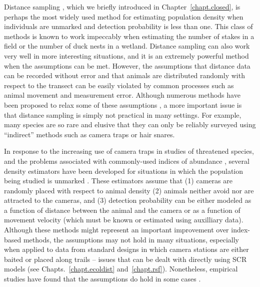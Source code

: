 Distance sampling \citep{buckland_etal:2001,buckland_etal:2004book}, which we briefly
introduced in Chapter~\ref{chapt.closed},
is perhaps the most widely used method for
estimating population density when individuals are unmarked and
detection probability is less than one. This class of methods is known
to work impeccably when estimating the number of stakes in a field or
the number of duck nests in a wetland. Distance sampling can also work very well in
more interesting situations, and it is an extremely powerful method when
the assumptions can be met. However, the assumptions that distance
data can be recorded without error and that animals are distributed
randomly with respect to the transect can be easily violated by
common processes such as animal movement and measurement
error. Although numerous methods have been proposed to
relax some of these assumptions
\citep{royle_etal:2004, borchers_etal:1998, johnson_etal:2010,
  marques_etal:2010, chandler_etal:2011},
a more important issue is that distance
sampling is simply not practical in many settings. For example, many
species are so rare and elusive that they can only be reliably
surveyed using ``indirect'' methods such as camera traps or hair
snares.

In response to the increasing use of camera traps in studies of
threatened species, and the problems associated with commonly-used
indices of abundance %
\citep{jennelle_etal:2002,obrien:2011,sollmann_etal:2013bioc},
several density estimators
have been developed for situations in which the population being
studied is unmarked \citep{rowcliffe_etal:2008,rowcliffe_etal:2011}.
These estimators assume that (1) cameras are randomly placed with
respect to animal density (2) animals neither avoid nor are attracted
to the cameras, and (3) detection probability can be either modeled as a function of
distance between the animal and the camera or as a function of
movement velocity (which must be known or estimated using auxilliary data). Although these methods might
represent an important improvement over index-based methods,
the assumptions may not hold in many situations, especially when
applied to data from standard designs in which camera stations are
either baited or placed along trails -- issues that can be dealt with
directly using SCR models (see Chapts.~\ref{chapt.ecoldist} and~\ref{chapt.rsf}).
Nonetheless, empirical studies
have found that the assumptions do hold in some cases
\citep{rowcliffe_etal:2008}.

